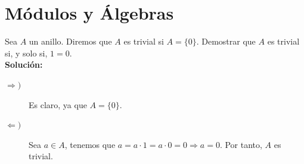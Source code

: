 \section{Módulos y Álgebras}

\begin{ejercicio}
    Sea $A$ un anillo. Diremos que $A$ es trivial si $A=\{0\}$. Demostrar que $A$ es trivial si, y solo si, $1=0$. \\

\noindent
\textbf{Solución:}
\begin{description}
    \item [$\Longrightarrow )$] Es claro, ya que $A = \{0\}$. 
    \item [$\Longleftarrow )$] Sea $a \in A$, tenemos que $a = a\cdot 1 = a \cdot 0 = 0 \Longrightarrow a = 0$. Por tanto, $A$ es trivial.
\end{description}
\end{ejercicio}


